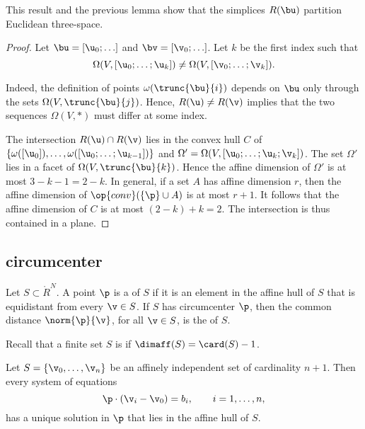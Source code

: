 This result and the previous lemma show that the simplices $R(\bu)$
partition Euclidean three-space.

\begin{proof} Let $\bu = [\u_0;\ldots]$ and $\bv = [\v_0;\ldots]$.  
Let $k$ be the
first index such that
\begin{displaymath}
\Omega(V,[\u_0;\ldots;\u_{k}]) \ne \Omega(V,[\v_0;\ldots;\v_{k}]).
\end{displaymath}

  Indeed, the definition of points
$\omega(\trunc{\bu}{i})$ depends on $\bu$ only through the sets
$\Omega(V,\trunc{\bu}{j})$.  Hence, $R(\u)\ne R(\v)$ implies that the
two sequences $\Omega(V,*)$ must differ at some index.

The intersection $R(\u)\cap R(\v)$ lies in the convex hull $C$ of
$\{\omega([\u_0]),\ldots,\omega( [\u_0;\ldots; \u_{k-1}])\}$ and
$\Omega'=\Omega(V,[\u_0;\ldots;\u_{k};\v_{k}])$.  The set $\Omega'$
lies in a facet of $\Omega(V,\trunc{\bu}{k})$.  Hence the affine
dimension of $\Omega'$ is at most $3-k-1=2-k$.  In general, if a set
$A$ has affine dimension $r$, then the affine dimension of
$\op{conv}(\{\p\}\cup A)$ is at most $r+1$.  It follows that the
affine dimension of $C$ is at most $(2-k)+ k = 2$.  The intersection
is thus contained in a plane.
\end{proof}


\subsection{circumcenter}

\begin{definition}
Let $S\subset\ring{R}^N$.  
A point $\p$ is a  of $S$ if it is an element
in the affine hull of $S$ that is equidistant from every $\v\in S$.  If $S$ has
circumcenter $\p$, then the common distance $\norm{\p}{\v}$, for all $\v\in S$,
is the  of  $S$.
\end{definition}

Recall that a finite set $S$
is  if $\dimaff(S) = \card(S) -1$.

\begin{lemma}\label{lemma:affine-system}
Let $S=\{\v_0,\ldots,\v_n\}$ be an affinely independent set of cardinality $n+1$.
Then every system of equations
\begin{displaymath}
\p \cdot (\v_i - \v_0) = b_i,\qquad i=1,\ldots,n,
\end{displaymath}
has a unique solution in $\p$ that lies in the affine hull of $S$.
\end{lemma}

